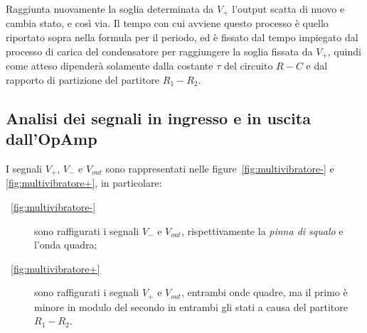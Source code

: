 \documentclass[10pt,a4paper]{article}
\begin{document}
Raggiunta nuovamente la soglia determinata da $V_+$ l'output scatta di nuovo e cambia stato, e così via. Il tempo con cui avviene questo processo è quello riportato sopra nella formula per il periodo, ed è fissato dal tempo impiegato dal processo di carica del condensatore per raggiungere la soglia fissata da $V_+$, quindi come atteso dipenderà solamente dalla costante $\tau$ del circuito $R-C$ e dal rapporto di partizione del partitore $R_1-R_2$.

\subsection{Analisi dei segnali in ingresso e in uscita dall'OpAmp}
I segnali $V_+$, $V_-$ e $V_{out}$ sono rappresentati nelle figure~\ref{fig:multivibratore-} e \ref{fig:multivibratore+}, in particolare:
\begin{description}
\item[\figurename{~\ref{fig:multivibratore-}}] sono raffigurati i segnali $V_-$ e $V_{out}$, rispettivamente la \emph{pinna di squalo} e l'onda quadra;
\item[\figurename{~\ref{fig:multivibratore+}}] sono raffigurati i segnali $V_+$ e $V_{out}$, entrambi onde quadre, ma il primo è minore in modulo del secondo in entrambi gli stati a causa del partitore $R_1-R_2$.
\end{description}
\end{document}
